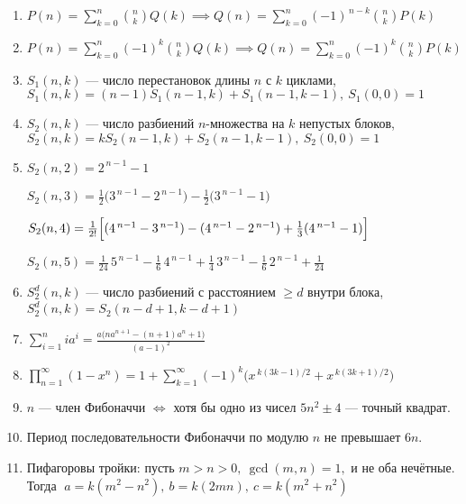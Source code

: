 \documentclass[9pt,a4paper,landscape,twosided]{extarticle}
\begin{document}
\begin{multicols*}{3}
\begin{enumerate}
\item %
$P(n)=\sum_{k=0}^{n}\binom{n}{k}Q(k) \implies Q(n)=\sum_{k=0}^{n}(-1)^{\,n-k}\binom{n}{k}P(k)$

\item %
$P(n)=\sum_{k=0}^{n}(-1)^k\binom{n}{k}Q(k) \implies Q(n)=\sum_{k=0}^{n}(-1)^k\binom{n}{k}P(k)$

\item %
$S_1(n,k)$ — число перестановок длины $n$ с $k$ циклами,
$S_1(n,k)=(n-1)S_1(n-1,k)+S_1(n-1,k-1),\ S_1(0,0)=1$

\item %
$S_2(n,k)$ — число разбиений $n$-множества на $k$ непустых блоков,
$S_2(n,k)=kS_2(n-1,k)+S_2(n-1,k-1),\ S_2(0,0)=1$

\item %
$S_2(n,2)=2^{\,n-1}-1$

$S_2(n,3)=\tfrac{1}{2}\bigl(3^{\,n-1}-2^{\,n-1}\bigr)-\tfrac{1}{2}\bigl(3^{\,n-1}-1\bigr)$

$S_2(n,4)=\tfrac{1}{2!}\Bigl[(4^{\,n-1}-3^{\,n-1})-(4^{\,n-1}-2^{\,n-1})+\tfrac{1}{3}(4^{\,n-1}-1)\Bigr]$

$S_2(n,5)=\tfrac{1}{24}\,5^{\,n-1}-\tfrac{1}{6}\,4^{\,n-1}
+\tfrac{1}{4}\,3^{\,n-1}-\tfrac{1}{6}\,2^{\,n-1}+\tfrac{1}{24}$

\item %
$S_2^d(n,k)$ — число разбиений с расстоянием $\ge d$ внутри блока,
$S_2^d(n,k)=S_2(n-d+1,k-d+1)$

\item %
$\sum_{i=1}^n i a^i=\frac{a\bigl(n a^{n+1}-(n+1)a^n+1\bigr)}{(a-1)^2}$

\item %
$\prod_{n=1}^\infty(1-x^n)=1+\sum_{k=1}^{\infty}(-1)^k\bigl(x^{\,k(3k-1)/2}+x^{\,k(3k+1)/2}\bigr)$

\item %
$n$ — член Фибоначчи $\iff$ хотя бы одно из чисел $5n^2\pm4$ — точный квадрат.

\item %
Период последовательности Фибоначчи по модулю $n$ не превышает $6n$.

\item %
Пифагоровы тройки: пусть $m>n>0,\ \gcd(m,n)=1,$ и не оба нечётные. Тогда
$\;a=k(m^2-n^2),\ b=k(2mn),\ c=k(m^2+n^2)$



\end{enumerate}
\end{multicols*}
\end{document}
